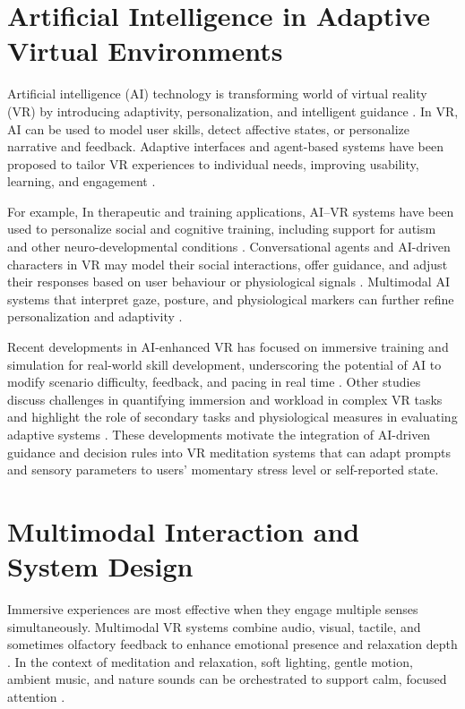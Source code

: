 \section{Artificial Intelligence in Adaptive Virtual Environments}
Artificial intelligence (AI) technology is transforming world of virtual reality (VR) by introducing adaptivity, personalization, and intelligent guidance \cite{zhou2020adaptive}. In VR, AI can be used to model user skills, detect affective states, or personalize narrative and feedback. Adaptive interfaces and agent-based systems have been proposed to tailor VR experiences to individual needs, improving usability, learning, and engagement \cite{zhou2020adaptive,arntz2019aivr}.

For example, In therapeutic and training applications, AI–VR systems have been used to personalize social and cognitive training, including support for autism and other neuro-developmental conditions \cite{bhatt2020autism}. Conversational agents and AI-driven characters in VR may model their social interactions, offer guidance, and adjust their responses based on user behaviour or physiological signals \cite{schlagowski2021empathy}. Multimodal AI systems that interpret gaze, posture, and physiological markers can further refine personalization and adaptivity \cite{martin2019multimodal}.

Recent developments in AI-enhanced VR has focused on immersive training and simulation for real-world skill development, underscoring the potential of AI to modify scenario difficulty, feedback, and pacing in real time \cite{elaine2025adaptivelearning}. Other studies discuss challenges in quantifying immersion and workload in complex VR tasks and highlight the role of secondary tasks and physiological measures in evaluating adaptive systems \cite{payne2024immersion,rubio2025stress}. These developments motivate the integration of AI-driven guidance and decision rules into VR meditation systems that can adapt prompts and sensory parameters to users’ momentary stress level or self-reported state.

\section{Multimodal Interaction and System Design}
Immersive experiences are most effective when they engage multiple senses simultaneously. Multimodal VR systems combine audio, visual, tactile, and sometimes olfactory feedback to enhance emotional presence and relaxation depth \cite{aimagery2023olfactory,martin2019multimodal}.  In the context of meditation and relaxation, soft lighting, gentle motion, ambient music, and nature sounds can be orchestrated to support calm, focused attention \cite{blum2019vrbreathing,shaw2011meditationchamber}.

